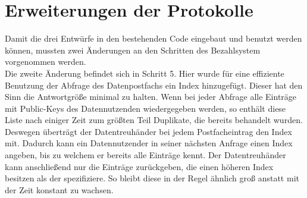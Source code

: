 \documentclass[
	fontsize=12pt,
	headings=small,
	parskip=half,           %
	bibliography=totoc,
	numbers=noenddot,       %
	open=any,               %
]{scrreprt}
\begin{document}
\section{Erweiterungen der Protokolle}
Damit die drei Entwürfe in den bestehenden Code eingebaut und benutzt werden können, mussten zwei Änderungen an den Schritten des Bezahlsystem vorgenommen werden. 
\\

Die zweite Änderung befindet sich in Schritt 5. Hier wurde für eine effiziente Benutzung der Abfrage des Datenpostfachs ein Index hinzugefügt. Dieser hat den Sinn die Antwortgröße minimal zu halten. Wenn bei jeder Abfrage alle Einträge mit Public-Keys des Datennutzenden wiedergegeben werden, so enthält diese Liste nach einiger Zeit zum größten Teil Duplikate, die bereits behandelt wurden. Deswegen überträgt der Datentreuhänder bei jedem Postfacheintrag den Index mit. Dadurch kann ein Datennutzender in seiner nächsten Anfrage einen Index angeben, bis zu welchem er bereits alle Einträge kennt. Der Datentreuhänder kann anschließend nur die Einträge zurückgeben, die einen höheren Index besitzen als der spezifiziere. So bleibt diese in der Regel ähnlich groß anstatt mit der Zeit konstant zu wachsen.
\end{document}
